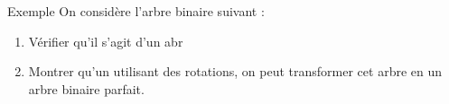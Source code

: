 \documentclass[10pt]{beamer}
\begin{document}
\begin{frame}[fragile]{\Ctitle}{\stitle}
	\begin{exampleblock}{Exemple}
		On considère l'arbre binaire suivant :
		\begin{center}
		\end{center}
		\begin{enumerate}
			\item<2-> Vérifier qu'il s'agit d'un {\sc abr}
			\item<3-> Montrer qu'un utilisant des rotations, on peut transformer cet arbre en un arbre binaire parfait.
		\end{enumerate}
	\end{exampleblock}
\end{frame}
\end{document}
